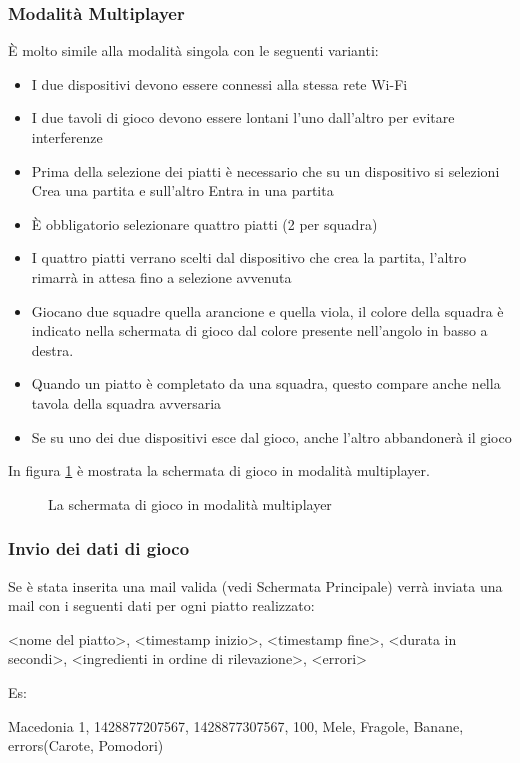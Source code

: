 \subsubsection{Modalità Multiplayer}
È molto simile alla modalità singola con le seguenti varianti:
\begin{itemize}
\item I due dispositivi devono essere connessi alla stessa rete Wi-Fi
\item I due tavoli di gioco devono essere lontani l’uno dall’altro per evitare interferenze
\item Prima della selezione dei piatti è necessario che su un dispositivo si selezioni Crea una partita e sull’altro Entra in una partita
\item È obbligatorio selezionare quattro piatti (2 per squadra)
\item I quattro piatti verrano scelti dal dispositivo che crea la partita, l’altro rimarrà in attesa fino a selezione avvenuta
\item Giocano due squadre quella arancione e quella viola, il colore della squadra è indicato nella schermata di gioco dal colore presente nell’angolo in basso a destra.
\item Quando un piatto è completato da una squadra, questo compare anche nella tavola della squadra avversaria
\item Se su uno dei due dispositivi esce dal gioco, anche l’altro abbandonerà il gioco
\end{itemize}
In figura \ref{fig:screen3} è mostrata la schermata di gioco in modalità multiplayer.

\begin{figure}[h!]
\caption{La schermata di gioco in modalità multiplayer}
\label{fig:screen3}
\end{figure}

\subsubsection{Invio dei dati di gioco}

Se è stata inserita una mail valida (vedi Schermata Principale) verrà inviata una mail con i seguenti dati per ogni piatto realizzato:

\textless nome del piatto\textgreater, \textless timestamp inizio\textgreater, \textless timestamp fine\textgreater, \textless durata in secondi\textgreater, \textless ingredienti in ordine di rilevazione\textgreater, \textless errori\textgreater

Es:

Macedonia 1, 1428877207567, 1428877307567, 100, Mele, Fragole, Banane, errors(Carote, Pomodori)
